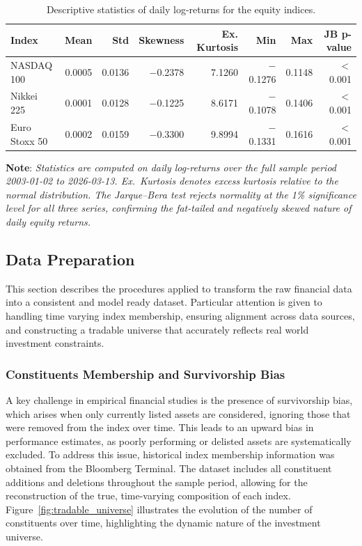 \documentclass[]{elsarticle}
\begin{document}
\linespread{1.5}\selectfont


\begin{table}[htbp]
\centering
\caption{Descriptive statistics of daily log-returns for the equity indices.}
\label{tab:return_summary}
\begin{tabular}{lrrrrrrr}
\toprule
Index & Mean & Std & Skewness & Ex. Kurtosis & Min & Max & JB p-value \\
\midrule
NASDAQ 100    & 0.0005 & 0.0136 & $-$0.2378 & 7.1260  & $-$0.1276 & 0.1148 & $<$0.001 \\
Nikkei 225    & 0.0001 & 0.0128 & $-$0.1225 & 8.6171 & $-$0.1078 & 0.1406 & $<$0.001 \\
Euro Stoxx 50 & 0.0002 & 0.0159 & $-$0.3300 & 9.8994  & $-$0.1331 & 0.1616 & $<$0.001 \\
\bottomrule
\end{tabular}
\end{table}

\vspace{-0.4cm}

\noindent\linespread{0.65}\selectfont
{\scriptsize \textbf{Note}: \textit{Statistics are computed on daily log-returns 
over the full sample period 2003-01-02 to 2026-03-13. Ex.\ Kurtosis denotes 
excess kurtosis relative to the normal distribution. The Jarque--Bera test 
rejects normality at the 1\% significance level for all three series, 
confirming the fat-tailed and negatively skewed nature of daily equity returns.}}

\linespread{1.5}\selectfont

\hypertarget{Data-Preperation}{%
\subsection{Data Preparation}\label{Data-Preperation}}

This section describes the procedures applied to transform the raw financial data into a consistent and model ready dataset. Particular attention is given to handling time varying index membership, ensuring alignment across data sources, and constructing a tradable universe that accurately reflects real world investment constraints.

\subsubsection{Constituents Membership and Survivorship Bias}
\label{sec:survivorship}

A key challenge in empirical financial studies is the presence of survivorship bias, which arises when only currently listed assets are considered, ignoring those that were removed from the index over time. This leads to an upward bias in performance estimates, as poorly performing or delisted assets are systematically excluded. To address this issue, historical index membership information was obtained from the Bloomberg Terminal. The dataset includes all constituent additions and deletions throughout the sample period, allowing for the reconstruction of the true, time-varying composition of each index. Figure~\ref{fig:tradable_universe} illustrates the evolution of the number of constituents over time, highlighting the dynamic nature of the investment universe.
\end{document}
